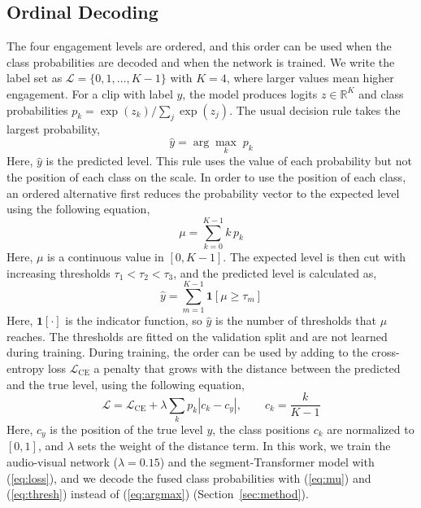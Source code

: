 \documentclass[journal]{IEEEtran}
\begin{document}
\subsection{Ordinal Decoding}
\label{sec:prelim_ordinal}

The four engagement levels are ordered, and this order can be used when the class probabilities are decoded and when the network is trained. We write the label set as $\mathcal{L} = \{0, 1, \ldots, K-1\}$ with $K = 4$, where larger values mean higher engagement. For a clip with label $y$, the model produces logits $z \in \mathbb{R}^{K}$ and class probabilities $p_k = \exp(z_k) / \sum_{j} \exp(z_j)$. The usual decision rule takes the largest probability,
\begin{equation}
\hat{y} = \arg\max_{k} \; p_k \label{eq:argmax}
\end{equation}
Here, $\hat{y}$ is the predicted level. This rule uses the value of each probability but not the position of each class on the scale. In order to use the position of each class, an ordered alternative first reduces the probability vector to the expected level using the following equation,
\begin{equation}
\mu = \sum_{k=0}^{K-1} k \, p_k \label{eq:mu}
\end{equation}
Here, $\mu$ is a continuous value in $[0, K-1]$. The expected level is then cut with increasing thresholds $\tau_1 < \tau_2 < \tau_3$, and the predicted level is calculated as,
\begin{equation}
\hat{y} = \sum_{m=1}^{K-1} \mathbf{1}\!\left[\mu \geq \tau_m\right] \label{eq:thresh}
\end{equation}
Here, $\mathbf{1}[\cdot]$ is the indicator function, so $\hat{y}$ is the number of thresholds that $\mu$ reaches. The thresholds are fitted on the validation split and are not learned during training. During training, the order can be used by adding to the cross-entropy loss $\mathcal{L}_{\mathrm{CE}}$ a penalty that grows with the distance between the predicted and the true level, using the following equation,
\begin{equation}
\mathcal{L} = \mathcal{L}_{\mathrm{CE}} + \lambda \sum_{k} p_k \left| c_k - c_y \right|, \qquad c_k = \frac{k}{K-1} \label{eq:loss}
\end{equation}
Here, $c_y$ is the position of the true level $y$, the class positions $c_k$ are normalized to $[0,1]$, and $\lambda$ sets the weight of the distance term. In this work, we train the audio-visual network ($\lambda = 0.15$) and the segment-Transformer model with (\ref{eq:loss}), and we decode the fused class probabilities with (\ref{eq:mu}) and (\ref{eq:thresh}) instead of (\ref{eq:argmax}) (Section~\ref{sec:method}).
\end{document}
